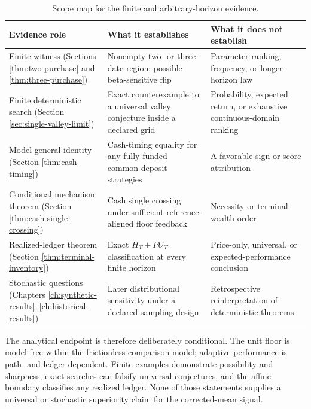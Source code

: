 \documentclass[12pt,a4paper,oneside]{report}
\begin{document}
\begin{table}[htbp]
  \centering
  \singlespacing\fontsize{9}{11}\selectfont
  \renewcommand{\arraystretch}{1.16}
  \begin{tabular}{L{0.22\textwidth}L{0.30\textwidth}L{0.38\textwidth}}
    \toprule
    \textbf{Evidence role} & \textbf{What it establishes} & \textbf{What it does not establish} \\
    \midrule
    Finite witness (Sections \ref{thm:two-purchase} and \ref{thm:three-purchase}) & Nonempty two- or three-date region; possible beta-sensitive flip & Parameter ranking, frequency, or longer-horizon law \\
    Finite deterministic search (Section \ref{sec:single-valley-limit}) & Exact counterexample to a universal valley conjecture inside a declared grid & Probability, expected return, or exhaustive continuous-domain ranking \\
    Model-general identity (Section \ref{thm:cash-timing}) & Cash-timing equality for any fully funded common-deposit strategies & A favorable sign or score attribution \\
    Conditional mechanism theorem (Section \ref{thm:cash-single-crossing}) & Cash single crossing under sufficient reference-aligned floor feedback & Necessity or terminal-wealth order \\
    Realized-ledger theorem (Section \ref{thm:terminal-inventory}) & Exact $H_T+P U_T$ classification at every finite horizon & Price-only, universal, or expected-performance conclusion \\
    Stochastic questions (Chapters \ref{ch:synthetic-results}--\ref{ch:historical-results}) & Later distributional sensitivity under a declared sampling design & Retrospective reinterpretation of deterministic theorems \\
    \bottomrule
  \end{tabular}
  \caption{Scope map for the finite and arbitrary-horizon evidence.}
  \label{tab:theorem-scope}
\end{table}

The analytical endpoint is therefore deliberately conditional. The unit floor
is model-free within the frictionless comparison model; adaptive performance is
path- and ledger-dependent. Finite examples demonstrate possibility and
sharpness, exact searches can falsify universal conjectures, and the affine
boundary classifies any realized ledger. None of those statements supplies a
universal or stochastic superiority claim for the corrected-mean signal.
\end{document}
